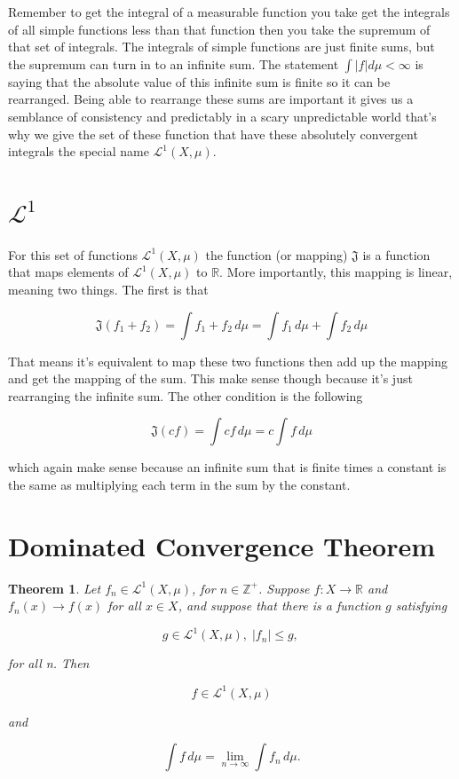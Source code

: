 \documentclass[oneside]{book}
\newtheorem{theorem}{Theorem}[chapter]
\begin{document}
Remember to get the integral of a measurable function you take get the integrals of all simple functions less than that function then you take the supremum of that set of integrals. The integrals of simple functions are just finite sums, but the supremum can turn in to an infinite sum. The statement $\int |f| d\mu < \infty$ is saying that the absolute value of this infinite sum is finite so it can be rearranged. Being able to rearrange these sums are important it gives us a semblance of consistency and predictably in a scary unpredictable world that's why we give the set of these function that have these absolutely convergent integrals the special name $\mathcal{L}^1(X,\mu)$. 

\section{$\mathcal{L}^1$}
For this set of functions $\mathcal{L}^1(X,\mu)$ the function (or mapping) $\mathfrak{J}$ is a function that maps elements of $\mathcal{L}^1(X,\mu)$ to $\mathbb{R}$. More importantly, this mapping is linear, meaning two things. The first is that

\begin{equation}
\mathfrak{J}(f_1+f_2) = \int f_1+f_2 \,d\mu = \int f_1\, d\mu + \int f_2\, d\mu
\end{equation}

That means it's equivalent to map these two functions then add up the mapping and get the mapping of the sum. This make sense though because it's just rearranging the infinite sum. The other condition is the following

\begin{equation}
\mathfrak{J}(cf) = \int cf \,d\mu = c \int f\, d\mu
\end{equation}

which again make sense because an infinite sum that is finite times a constant is the same as multiplying each term in the sum by the constant.

\section{Dominated Convergence Theorem}
\begin{theorem}
Let $f_n \in \mathcal{L}^1(X,\mu)$, for $n \in \mathbb{Z}^+$. Suppose $f: X \to \mathbb{R}$ and $f_n(x) \to f(x)$ for all $x \in X$, and suppose that there is a function $g$ satisfying

\begin{equation}
g \in \mathcal{L}^1(X,\mu),\; |f_n| \le g,\, 
\end{equation}

for all n. Then

\begin{equation}
f \in \mathcal{L}^1(X,\mu)
\end{equation}

and

\begin{equation}
\int f\, d\mu = \lim_{n \to \infty} \int f_n\, d\mu.
\end{equation}
\end{theorem}
\end{document}
